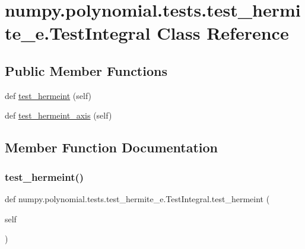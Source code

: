 \hypertarget{classnumpy_1_1polynomial_1_1tests_1_1test__hermite__e_1_1TestIntegral}{}\section{numpy.\+polynomial.\+tests.\+test\+\_\+hermite\+\_\+e.\+Test\+Integral Class Reference}
\label{classnumpy_1_1polynomial_1_1tests_1_1test__hermite__e_1_1TestIntegral}
\subsection*{Public Member Functions}
\begin{DoxyCompactItemize}
\item 
def \hyperlink{classnumpy_1_1polynomial_1_1tests_1_1test__hermite__e_1_1TestIntegral_ae51e64eabe4f5d241068badc96c3aa33}{test\+\_\+hermeint} (self)
\item 
def \hyperlink{classnumpy_1_1polynomial_1_1tests_1_1test__hermite__e_1_1TestIntegral_aa0f0f0ea85afc66754bd73059ecf6430}{test\+\_\+hermeint\+\_\+axis} (self)
\end{DoxyCompactItemize}


\subsection{Member Function Documentation}
\mbox{\label{classnumpy_1_1polynomial_1_1tests_1_1test__hermite__e_1_1TestIntegral_ae51e64eabe4f5d241068badc96c3aa33}} 
\subsubsection{\texorpdfstring{test\+\_\+hermeint()}{test\_hermeint()}}
{\footnotesize\ttfamily def numpy.\+polynomial.\+tests.\+test\+\_\+hermite\+\_\+e.\+Test\+Integral.\+test\+\_\+hermeint (\begin{DoxyParamCaption}\item[{}]{self }\end{DoxyParamCaption})}

